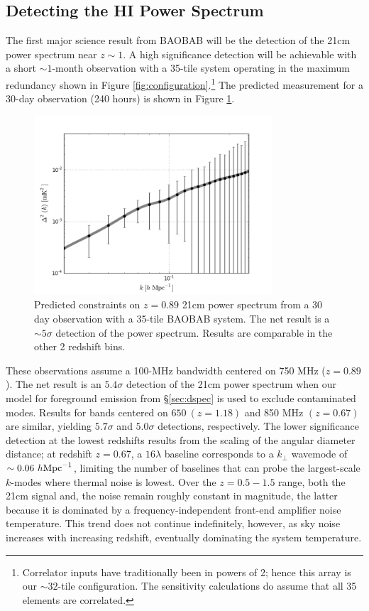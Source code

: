 \documentclass[10pt,iop]{emulateapj}
\begin{document}
\subsection{Detecting the HI Power Spectrum}
\label{sec:baobab32}

The first major science result from BAOBAB will be the detection of the 21cm power spectrum near 
$z\sim1$.  A high significance detection will be achievable with a short $\sim1$-month observation
with a 35-tile system operating in the 
maximum redundancy shown in Figure \ref{fig:configuration}.\footnote{Correlator inputs have 
traditionally been in powers of 2; hence this array is our $\sim 32$-tile configuration. The sensitivity calculations do assume that all 35 elements are correlated.}  
The predicted measurement for a 30-day observation 
(240 hours) is shown in Figure \ref{fig:baobab32_sense}.  
\begin{figure}\centering
\includegraphics[width=3.5in]{baobab32_sense-2.png}
\caption{Predicted constraints on $z = 0.89$ 21cm power spectrum from a 30 day observation with
a 35-tile BAOBAB system.  The net result is a $\sim5\sigma$ detection of the
power spectrum.  Results are comparable in the other 2 redshift bins. 
} \label{fig:baobab32_sense}
\end{figure}
These observations assume a 100-MHz
bandwidth centered on 750 MHz ($z = 0.89$).  The net result is an $5.4\sigma$ detection of
the 21cm power spectrum when our model for foreground emission from \S\ref{sec:dspec}
is used to exclude contaminated modes.  
Results for bands centered on $650~(z = 1.18)$ and 850 MHz $(z = 0.67)$
are similar, yielding $5.7\sigma$ and $5.0\sigma$ detections, respectively.
The lower
significance detection at the lowest redshifts results from the scaling of the angular diameter
distance; at redshift $z = 0.67$, a $16\lambda$ baseline corresponds to a $k_{\perp}$ wavemode
of $\sim0.06~h{\rm Mpc}^{-1}$, limiting the number of baselines that can probe
the largest-scale $k$-modes where thermal noise is lowest.  
Over the $z = 0.5-1.5$ range, both the 21cm signal and,
the noise remain roughly constant in magnitude, the latter because it is dominated 
by a frequency-independent
front-end amplifier noise temperature.  This trend does not continue indefinitely, however,
as sky noise increases with increasing redshift, eventually dominating the system temperature.
  
\end{document}
